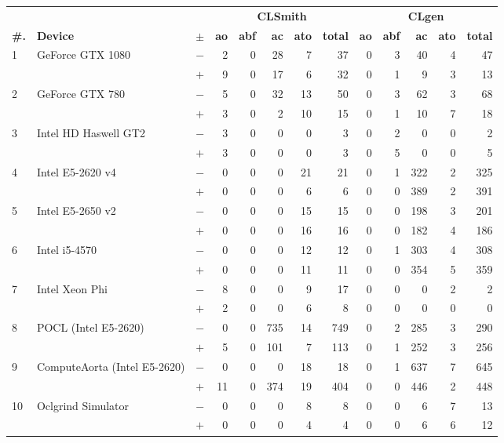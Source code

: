   \begin{tabular}{lll | rrrrr | rrrrr }
  \toprule
  & & & \multicolumn{5}{c|}{\textbf{CLSmith}} & \multicolumn{5}{c}{\textbf{CLgen}} \\
  \textbf{\#.} & \textbf{Device} & $\pm$ &
  \textbf{ao} & \textbf{abf} & \textbf{ac} & \textbf{ato} & \textbf{total} &
  \textbf{ao} & \textbf{abf} & \textbf{ac} & \textbf{ato} & \textbf{total} \\
  \midrule
  \multirow{ 2}{*}{1} & \multirow{ 2}{*}{GeForce GTX 1080} & $-$ & 2 & 0 & 28 & 7 & 37       & 0 & 3 & 40 & 4 & 47 \\& & $+$ & 9 & 0 & 17 & 6 & 32 & 0 & 1 & 9 & 3 & 13 \\
\hline
\multirow{ 2}{*}{2} & \multirow{ 2}{*}{GeForce GTX 780} & $-$ & 5 & 0 & 32 & 13 & 50       & 0 & 3 & 62 & 3 & 68 \\& & $+$ & 3 & 0 & 2 & 10 & 15 & 0 & 1 & 10 & 7 & 18 \\
\hline
\multirow{ 2}{*}{3} & \multirow{ 2}{*}{Intel HD Haswell GT2} & $-$ & 3 & 0 & 0 & 0 & 3       & 0 & 2 & 0 & 0 & 2 \\& & $+$ & 3 & 0 & 0 & 0 & 3 & 0 & 5 & 0 & 0 & 5 \\
\hline
\multirow{ 2}{*}{4} & \multirow{ 2}{*}{Intel E5-2620 v4} & $-$ & 0 & 0 & 0 & 21 & 21       & 0 & 1 & 322 & 2 & 325 \\& & $+$ & 0 & 0 & 0 & 6 & 6 & 0 & 0 & 389 & 2 & 391 \\
\hline
\multirow{ 2}{*}{5} & \multirow{ 2}{*}{Intel E5-2650 v2} & $-$ & 0 & 0 & 0 & 15 & 15       & 0 & 0 & 198 & 3 & 201 \\& & $+$ & 0 & 0 & 0 & 16 & 16 & 0 & 0 & 182 & 4 & 186 \\
\hline
\multirow{ 2}{*}{6} & \multirow{ 2}{*}{Intel i5-4570} & $-$ & 0 & 0 & 0 & 12 & 12       & 0 & 1 & 303 & 4 & 308 \\& & $+$ & 0 & 0 & 0 & 11 & 11 & 0 & 0 & 354 & 5 & 359 \\
\hline
\multirow{ 2}{*}{7} & \multirow{ 2}{*}{Intel Xeon Phi} & $-$ & 8 & 0 & 0 & 9 & 17       & 0 & 0 & 0 & 2 & 2 \\& & $+$ & 2 & 0 & 0 & 6 & 8 & 0 & 0 & 0 & 0 & 0 \\
\hline
\multirow{ 2}{*}{8} & \multirow{ 2}{*}{POCL (Intel E5-2620)} & $-$ & 0 & 0 & 735 & 14 & 749       & 0 & 2 & 285 & 3 & 290 \\& & $+$ & 5 & 0 & 101 & 7 & 113 & 0 & 1 & 252 & 3 & 256 \\
\hline
\multirow{ 2}{*}{9} & \multirow{ 2}{*}{ComputeAorta (Intel E5-2620)} & $-$ & 0 & 0 & 0 & 18 & 18       & 0 & 1 & 637 & 7 & 645 \\& & $+$ & 11 & 0 & 374 & 19 & 404 & 0 & 0 & 446 & 2 & 448 \\
\hline
\multirow{ 2}{*}{10} & \multirow{ 2}{*}{Oclgrind Simulator} & $-$ & 0 & 0 & 0 & 8 & 8       & 0 & 0 & 6 & 7 & 13 \\& & $+$ & 0 & 0 & 0 & 4 & 4 & 0 & 0 & 6 & 6 & 12 \\
  \bottomrule
\end{tabular}

